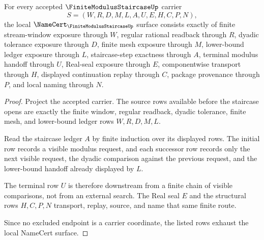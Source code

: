 \begin{theorem}
\label{thm:finite-modulus-staircase-namecert-obligations}
For every accepted $\FiniteModulusStaircaseUp$ carrier
$$
S=(W,R,D,M,L,A,U,E,H,C,P,N),
$$
the local $\NameCert_{\FiniteModulusStaircaseUp}$ surface consists exactly of finite stream-window exposure through $W$, regular rational readback through $R$, dyadic tolerance exposure through $D$, finite mesh exposure through $M$, lower-bound ledger exposure through $L$, staircase-step exactness through $A$, terminal modulus handoff through $U$, Real-seal exposure through $E$, componentwise transport through $H$, displayed continuation replay through $C$, package provenance through $P$, and local naming through $N$.
\end{theorem}
\begin{proof}
Project the accepted carrier. The source rows available before the staircase opens are exactly the finite window, regular readback, dyadic tolerance, finite mesh, and lower-bound ledger rows $W,R,D,M,L$.

Read the staircase ledger $A$ by finite induction over its displayed rows. The initial row records a visible modulus request, and each successor row records only the next visible request, the dyadic comparison against the previous request, and the lower-bound handoff already displayed by $L$.

The terminal row $U$ is therefore downstream from a finite chain of visible comparisons, not from an external search. The Real seal $E$ and the structural rows $H,C,P,N$ transport, replay, source, and name that same finite route.

Since no excluded endpoint is a carrier coordinate, the listed rows exhaust the local NameCert surface.
\end{proof}

